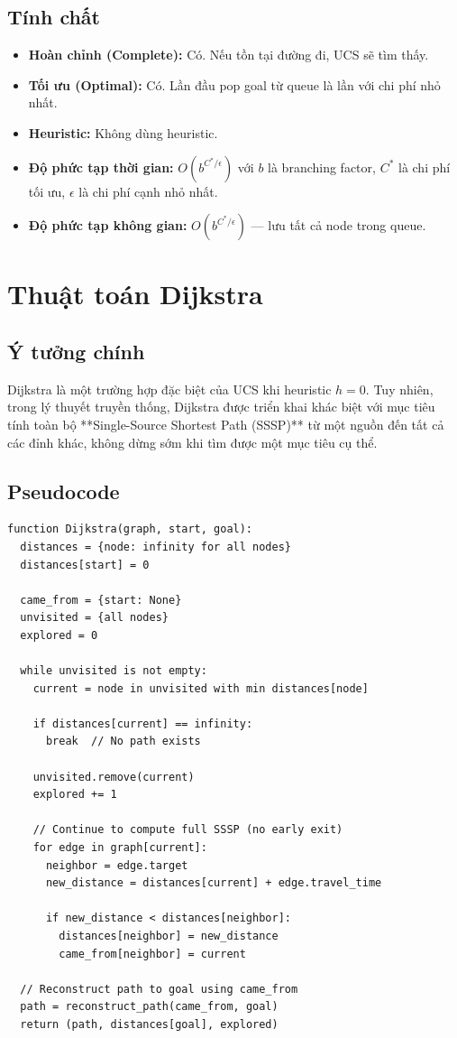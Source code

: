 \subsection{Tính chất}

\begin{itemize}
  \item \textbf{Hoàn chỉnh (Complete):} Có. Nếu tồn tại đường đi, UCS sẽ tìm thấy.
  \item \textbf{Tối ưu (Optimal):} Có. Lần đầu pop goal từ queue là lần với chi phí nhỏ nhất.
  \item \textbf{Heuristic:} Không dùng heuristic.
  \item \textbf{Độ phức tạp thời gian:} $O(b^{C^*/\epsilon})$ với $b$ là branching factor, $C^*$ là chi phí tối ưu, $\epsilon$ là chi phí cạnh nhỏ nhất.
  \item \textbf{Độ phức tạp không gian:} $O(b^{C^*/\epsilon})$ --- lưu tất cả node trong queue.
\end{itemize}

\section{Thuật toán Dijkstra}

\subsection{Ý tưởng chính}

Dijkstra là một trường hợp đặc biệt của UCS khi heuristic $h = 0$. Tuy nhiên, trong lý thuyết truyền thống, Dijkstra được triển khai khác biệt với mục tiêu tính toàn bộ **Single-Source Shortest Path (SSSP)** từ một nguồn đến tất cả các đỉnh khác, không dừng sớm khi tìm được một mục tiêu cụ thể.

\subsection{Pseudocode}

\begin{lstlisting}[caption=Dijkstra Algorithm Pseudocode]
function Dijkstra(graph, start, goal):
  distances = {node: infinity for all nodes}
  distances[start] = 0

  came_from = {start: None}
  unvisited = {all nodes}
  explored = 0

  while unvisited is not empty:
    current = node in unvisited with min distances[node]

    if distances[current] == infinity:
      break  // No path exists

    unvisited.remove(current)
    explored += 1

    // Continue to compute full SSSP (no early exit)
    for edge in graph[current]:
      neighbor = edge.target
      new_distance = distances[current] + edge.travel_time

      if new_distance < distances[neighbor]:
        distances[neighbor] = new_distance
        came_from[neighbor] = current

  // Reconstruct path to goal using came_from
  path = reconstruct_path(came_from, goal)
  return (path, distances[goal], explored)
\end{lstlisting}

